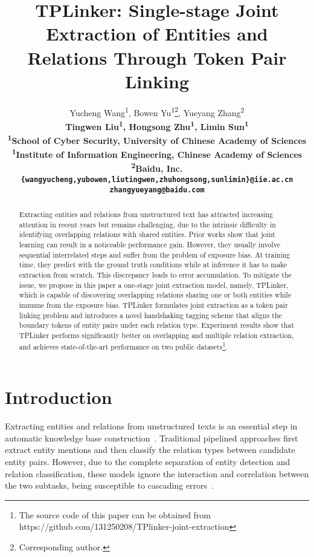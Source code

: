 \documentclass[11pt]{article}
\title{TPLinker: Single-stage Joint Extraction of Entities and Relations Through Token Pair Linking}
\author{
  Yucheng Wang\textsuperscript{1}, Bowen Yu\textsuperscript{1}\thanks{{} {} Corresponding author.}, Yueyang Zhang\textsuperscript{2}\\ 
  \bf Tingwen Liu\textsuperscript{1}, Hongsong Zhu\textsuperscript{1}, Limin Sun\textsuperscript{1}\\
  \textsuperscript{1}School of Cyber Security, University of Chinese Academy of Sciences \\
  \textsuperscript{1}Institute of Information Engineering, Chinese Academy of Sciences \\
  \textsuperscript{2}Baidu, Inc. \\
  {\tt \{wangyucheng,yubowen,liutingwen,zhuhongsong,sunlimin\}@iie.ac.cn}\\
  {\tt zhangyueyang@baidu.com}
 }
\date{}
\begin{document}
\maketitle
\begin{abstract}
Extracting entities and relations from unstructured text has attracted increasing attention in recent years but remains challenging, due to the intrinsic difficulty in identifying overlapping relations with shared entities. Prior works show that joint learning can result in a noticeable performance gain.  However, they usually involve sequential interrelated steps and suffer from the problem of exposure bias. At training time, they predict with the ground truth conditions while at inference it has to make extraction from scratch. This discrepancy leads to error accumulation. To mitigate the issue, we propose in this paper a one-stage joint extraction model, namely, TPLinker, which is capable of discovering overlapping relations sharing one or both entities while immune from the exposure bias. TPLinker formulates joint extraction as a token pair linking problem and introduces a novel handshaking tagging scheme that aligns the boundary tokens of entity pairs under each relation type. Experiment results show that TPLinker performs significantly better on overlapping and multiple relation extraction, and achieves state-of-the-art performance on two public datasets\footnote{The source code of this paper can be obtained from https://github.com/131250208/TPlinker-joint-extraction}.
\end{abstract}


\section{Introduction}
Extracting entities and relations from unstructured texts is  an essential step in automatic knowledge base construction~\cite{takanobu2019hierarchical}.
Traditional pipelined approaches first extract entity mentions and then classify the relation types between candidate entity pairs.
However, due to the complete separation of entity detection and relation classification, these models ignore the interaction and correlation between the two subtasks, being susceptible to cascading errors~\cite{li2014incremental}.
\end{document}
